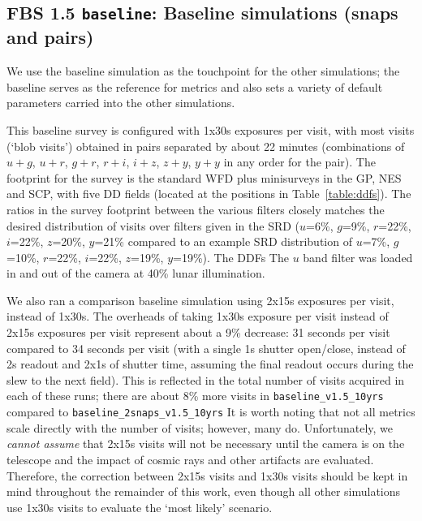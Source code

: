 
\subsection{FBS 1.5 {\tt baseline}: Baseline simulations (snaps and pairs)}\label{ss:baseline}

We use the baseline simulation as the touchpoint for the other simulations; the baseline serves as the reference for metrics and also sets a variety of default parameters carried into the other simulations. 

This baseline survey is configured with 1x30s exposures per visit, with most visits (`blob visits') obtained in pairs separated by about 22 minutes (combinations of $u+g$, $u+r$, $g+r$, $r+i$, $i+z$, $z+y$, $y+y$ in any order for the pair). The footprint for the survey is the standard WFD plus minisurveys in the GP, NES and SCP, with five DD fields (located at the positions in Table~\ref{table:ddfs}). The ratios in the survey footprint between the various filters closely matches the desired distribution of visits over filters given in the SRD ($u$=6\%, $g$=9\%, $r$=22\%, $i$=22\%, $z$=20\%, $y$=21\% compared to an example SRD distribution of $u$=7\%, $g$=10\%, $r$=22\%, $i$=22\%, $z$=19\%, $y$=19\%). The DDFs The $u$ band filter was loaded in and out of the camera at 40\% lunar illumination. 

We also ran a comparison baseline simulation using 2x15s exposures per visit, instead of 1x30s. The overheads of taking 1x30s exposure per visit instead of 2x15s exposures per visit represent about a 9\% decrease: 31 seconds per visit compared to 34 seconds per visit (with a single 1s shutter open/close, instead of 2s readout and 2x1s of shutter time, assuming the final readout occurs during the slew to the next field). This is reflected in the total number of visits acquired in each of these runs; there are about 8\% more visits in {\tt baseline\_v1.5\_10yrs} compared to {\tt baseline\_2snaps\_v1.5\_10yrs} It is worth noting that not all metrics scale directly with the number of visits; however, many do. Unfortunately, we {\it cannot assume} that 2x15s visits will not be necessary until the camera is on the telescope and the impact of cosmic rays and other artifacts are evaluated. Therefore, the correction between 2x15s visits and 1x30s visits should be kept in mind throughout the remainder of this work, even though all other simulations use 1x30s visits to evaluate the `most likely' scenario. 


